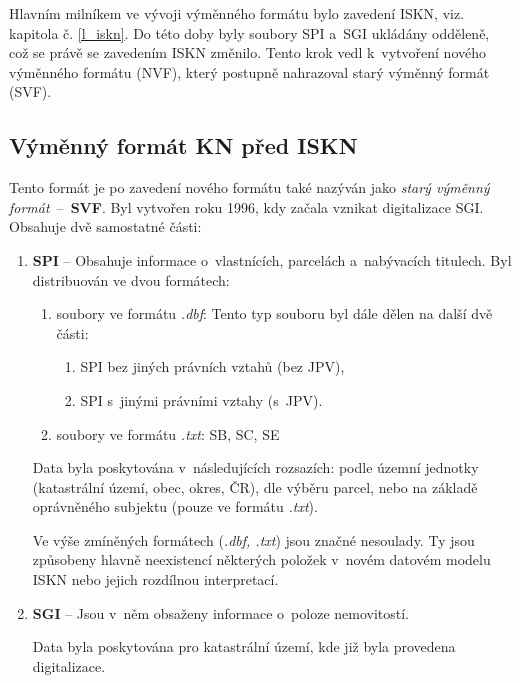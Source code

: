 \documentclass[a4paper,12pt,oneside]{book}
\begin{document}
Hlavním milníkem ve vývoji výměnného formátu bylo zavedení ISKN,
viz. kapitola č. \ref{l_iskn}. Do této doby byly soubory SPI a~SGI
ukládány odděleně, což se právě se zavedením ISKN změnilo. Tento krok
vedl k~vytvoření nového výměnného formátu (NVF), který postupně
nahrazoval starý výměnný formát (SVF). \cite{dp_landa}

\subsection{Výměnný formát KN před ISKN}

Tento formát je po zavedení nového formátu také nazýván jako \textit{starý
  výměnný formát}~--~\textbf{SVF}. Byl vytvořen roku 1996, kdy začala
vznikat digitalizace SGI. Obsahuje dvě samostatné části:

\begin{enumerate}
 \item \textbf{SPI} -- Obsahuje informace o~vlastnících, parcelách a~nabývacích titulech. Byl distribuován ve dvou formátech:
 \begin{enumerate}
  \item soubory ve formátu \textit{.dbf}: Tento typ souboru byl dále dělen na další dvě části:
  
  \begin{enumerate}
   \item SPI bez jiných právních vztahů (bez JPV),
   \item SPI s~jinými právními vztahy (s~JPV).
  \end{enumerate}
  
  \item soubory ve formátu \textit{.txt}: SB, SC, SE
 \end{enumerate}
 
 Data byla poskytována v~následujících rozsazích: podle územní
 jednotky (katastrální území, obec, okres, ČR), dle výběru parcel,
 nebo na základě oprávněného subjektu (pouze ve formátu
 \textit{.txt}).
 
 Ve výše zmíněných formátech (\textit{.dbf, .txt}) jsou značné
 nesoulady. Ty jsou způsobeny hlavně neexistencí některých položek
 v~novém datovém modelu ISKN nebo jejich rozdílnou interpretací.

 \item \textbf{SGI} -- Jsou v~něm obsaženy informace o~poloze nemovitostí. 
 
   Data byla poskytována pro katastrální území, kde již byla provedena
   digitalizace.
\end{enumerate}
\end{document}
